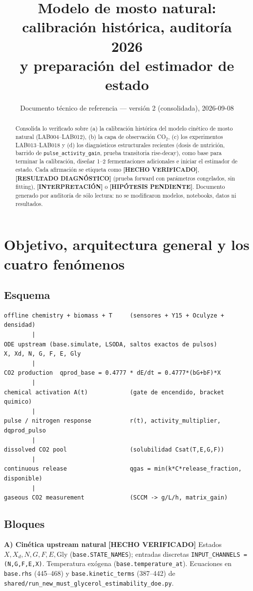 \documentclass[11pt,a4paper]{article}
\title{Modelo de mosto natural: calibraci\'on hist\'orica, auditor\'ia 2026\\y preparaci\'on del estimador de estado}
\author{Documento t\'ecnico de referencia --- versi\'on 2 (consolidada), 2026-09-08}
\date{}
\newcommand{\code}[1]{\nolinkurl{#1}}
\newcommand{\hecho}{\textcolor{hecho}{\textbf{[HECHO VERIFICADO]}}}
\newcommand{\diag}{\textcolor{diagc}{\textbf{[RESULTADO DIAGN\'OSTICO]}}}
\newcommand{\interp}{\textcolor{interp}{\textbf{[INTERPRETACI\'ON]}}}
\newcommand{\hipo}{\textcolor{hipo}{\textbf{[HIP\'OTESIS PENDIENTE]}}}
\newcommand{\ruta}[1]{\texttt{\small #1}}
\begin{document}
\maketitle

\begin{abstract}
Consolida lo verificado sobre (a) la calibraci\'on hist\'orica del modelo cin\'etico de mosto natural (LAB004--LAB012), (b) la capa de observaci\'on CO$_2$, (c) los experimentos LAB013--LAB018 y (d) los diagn\'osticos estructurales recientes (dosis de nutrici\'on, barrido de \code{pulse_activity_gain}, prueba transitoria rise-decay), como base para terminar la calibraci\'on, dise\~nar 1--2 fermentaciones adicionales e iniciar el estimador de estado. Cada afirmaci\'on se etiqueta como \hecho{}, \diag{} (prueba forward con par\'ametros congelados, sin fitting), \interp{} o \hipo{}. Documento generado por auditor\'ia de s\'olo lectura: no se modificaron modelos, notebooks, datos ni resultados.
\end{abstract}

\tableofcontents

\section{Objetivo, arquitectura general y los cuatro fen\'omenos}

\subsection{Esquema}
\begin{verbatim}
offline chemistry + biomass + T     (sensores + Y15 + Oculyze + densidad)
        |
ODE upstream (base.simulate, LSODA, saltos exactos de pulsos)
X, Xd, N, G, F, E, Gly
        |
CO2 production  qprod_base = 0.4777 * dE/dt = 0.4777*(bG+bF)*X
        |
chemical activation A(t)            (gate de encendido, bracket quimico)
        |
pulse / nitrogen response           r(t), activity_multiplier, dqprod_pulso
        |
dissolved CO2 pool                  (solubilidad Csat(T,E,G,F))
        |
continuous release                  qgas = min(k*C*release_fraction, disponible)
        |
gaseous CO2 measurement             (SCCM -> g/L/h, matrix_gain)
\end{verbatim}

\subsection{Bloques}
\textbf{A) Cin\'etica upstream natural} \hecho{} Estados $X, X_d, N, G, F, E, \mathrm{Gly}$ (\ruta{base.STATE\_NAMES}); entradas discretas \ruta{INPUT\_CHANNELS = (N,G,F,E,X)}. Temperatura ex\'ogena (\ruta{base.temperature\_at}). Ecuaciones en \ruta{base.rhs} (445--468) y \ruta{base.kinetic\_terms} (387--442) de \code{shared/run_new_must_glycerol_estimability_doe.py}.
\end{document}
